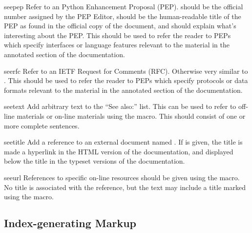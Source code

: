 \documentclass{howto}
\begin{document}
    \begin{macrodesc}{seepep}{}
      Refer to an Python Enhancement Proposal (PEP).  
      should be the official number assigned by the PEP Editor,
       should be the human-readable title of the PEP as
      found in the official copy of the document, and  should
      explain what's interesting about the PEP.  This should be used
      to refer the reader to PEPs which specify interfaces or language
      features relevant to the material in the annotated section of the
      documentation.
    \end{macrodesc}

    \begin{macrodesc}{seerfc}{}
      Refer to an IETF Request for Comments (RFC).  Otherwise very
      similar to .  This should be used
      to refer the reader to PEPs which specify protocols or data
      formats relevant to the material in the annotated section of the
      documentation.
    \end{macrodesc}

    \begin{macrodesc}{seetext}{}
      Add arbitrary text  to the ``See also:'' list.  This
      can be used to refer to off-line materials or on-line materials
      using the  macro.  This should consist of one or more
      complete sentences.
    \end{macrodesc}

    \begin{macrodesc}{seetitle}{}
      Add a reference to an external document named .  If
       is given, the title is made a hyperlink in the HTML
      version of the documentation, and displayed below the title in
      the typeset versions of the documentation.
    \end{macrodesc}

    \begin{macrodesc}{seeurl}{}
      References to specific on-line resources should be given using
      the  macro.  No title is associated with the
      reference, but the  text may include a title marked
      using the  macro.
    \end{macrodesc}


  \subsection{Index-generating Markup \label{indexing}}
\end{document}
